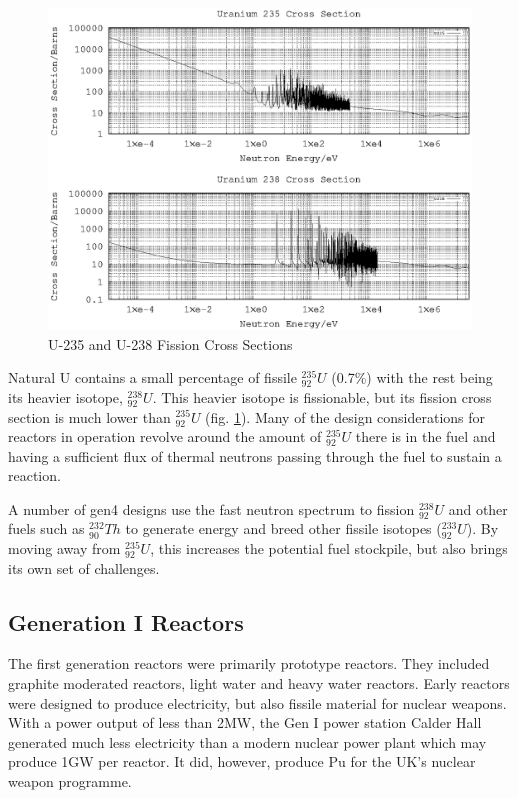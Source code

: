 \begin{figure}[tbp]
  \begin{center}
    \includegraphics[width=.8\linewidth]{chapters/introduction/plots/uranium_cross_section/u_xs}%
    \caption{U-235 and U-238 Fission Cross Sections}
    \label{figure:u235u238fissionxs}
  \end{center}
\end{figure}

Natural U contains a small percentage of fissile ${}^{235}_{92}U$ (0.7\%) with the rest being its heavier isotope, ${}^{238}_{92}U$.  This heavier isotope is fissionable, but its fission cross section is much lower than ${}^{235}_{92}U$ (fig. \ref{figure:u235u238fissionxs}).  Many of the design considerations for reactors in operation revolve around the amount of ${}^{235}_{92}U$ there is in the fuel and having a sufficient flux of thermal neutrons passing through the fuel to sustain a reaction.

A number of \acrshort{gen4} designs use the fast neutron spectrum to fission ${}^{238}_{92}U$ and other fuels such as ${}^{232}_{90}Th$ to generate energy and breed other fissile isotopes (${}^{233}_{92}U$).  By moving away from ${}^{235}_{92}U$, this increases the potential fuel stockpile, but also brings its own set of challenges.


\FloatBarrier

\subsection{Generation I Reactors}

The first generation reactors were primarily prototype reactors.  They included graphite moderated reactors, light water and heavy water reactors.  Early reactors were designed to produce electricity, but also fissile material for nuclear weapons.  With a power output of less than 2MW, the Gen I power station Calder Hall generated much less electricity than a modern nuclear power plant which may produce 1GW per reactor.  It did, however, produce \Gls{Pu} for the UK's nuclear weapon programme.

